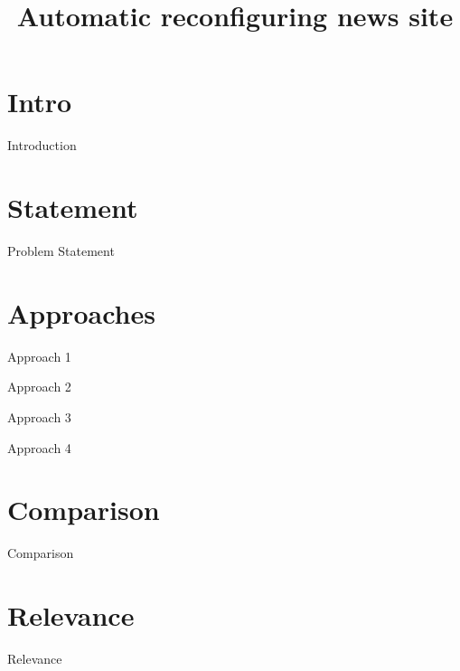 \documentclass{beamer}
\title{Automatic reconfiguring news site}
\begin{document}
\section{Intro}
\begin{frame}{Introduction}
    \maketitle
\end{frame}
\section{Statement}
\begin{frame}{Problem Statement}
	\maketitle
\end{frame}
\section{Approaches}
\begin{frame}{Approach 1}
	\maketitle
\end{frame}
\begin{frame}{Approach 2}
	\maketitle
\end{frame}
\begin{frame}{Approach 3}
	\maketitle
\end{frame}
\begin{frame}{Approach 4}
	\maketitle
\end{frame}
\section{Comparison}
\begin{frame}{Comparison}
\end{frame}
\section{Relevance}
\begin{frame}{Relevance}
\end{frame}
\end{document}
